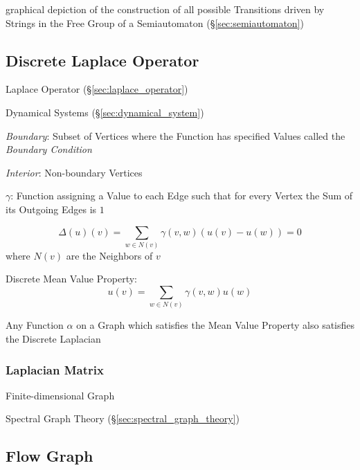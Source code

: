 graphical depiction of the construction of all possible Transitions
driven by Strings in the Free Group of a Semiautomaton
(\S\ref{sec:semiautomaton})




\subsection{Discrete Laplace Operator}\label{sec:discrete_laplace}

Laplace Operator (\S\ref{sec:laplace_operator})

Dynamical Systems (\S\ref{sec:dynamical_system})

\emph{Boundary}: Subset of Vertices where the Function has specified
Values called the \emph{Boundary Condition}

\emph{Interior}: Non-boundary Vertices

$\gamma$: Function assigning a Value to each Edge such that for every
Vertex the Sum of its Outgoing Edges is $1$

\[
  \Delta(u)(v) = \sum_{w \in N(v)} \gamma(v,w)(u(v) - u(w)) = 0
\]
where $N(v)$ are the Neighbors of $v$


Discrete Mean Value Property:
\[
  u(v) = \sum_{w \in N(v)} \gamma (v,w)u(w)
\]

Any Function $\alpha$ on a Graph which satisfies the Mean Value
Property also satisfies the Discrete Laplacian



\subsubsection{Laplacian Matrix}\label{sec:laplacian_matrix}

Finite-dimensional Graph

\fist Spectral Graph Theory (\S\ref{sec:spectral_graph_theory})



\subsection{Flow Graph}\label{sec:flow_graph}

